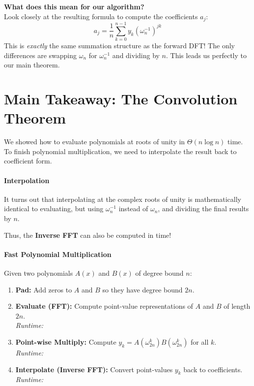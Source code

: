 \documentclass[11  pt]{article}
\begin{document}
\vs{1cm}

\textbf{What does this mean for our algorithm?} \\
Look closely at the resulting formula to compute the coefficients $a_j$:
\begin{equation*}
    a_j = \frac{1}{n} \sum_{k=0}^{n-1} y_k (\omega_n^{-1})^{jk}
\end{equation*}
This is \emph{exactly} the same summation structure as the forward DFT! The only differences are swapping $\omega_n$ for $\omega_n^{-1}$ and dividing by $n$. This leads us perfectly to our main theorem.

\newpage

\section{Main Takeaway: The Convolution Theorem}

We showed how to evaluate polynomials at roots of unity in $\Theta(n \log n)$ time. To finish polynomial multiplication, we need to interpolate the result back to coefficient form.

\paragraph{Interpolation} 
It turns out that interpolating at the complex roots of unity is mathematically identical to evaluating, but using $\omega_n^{-1}$ instead of $\omega_n$, and dividing the final results by $n$. 

Thus, the \textbf{Inverse FFT} can also be computed in  time!

\vs{1.5cm}

\paragraph{Fast Polynomial Multiplication}

Given two polynomials $A(x)$ and $B(x)$ of degree bound $n$:
\begin{enumerate}
    \setlength\itemsep{2em}
    \item \textbf{Pad:} Add zeros to $A$ and $B$ so they have degree bound $2n$.
    \item \textbf{Evaluate (FFT):} Compute point-value representations of $A$ and $B$ of length $2n$. \\ \textit{Runtime: }
    \item \textbf{Point-wise Multiply:} Compute $y_k = A(\omega_{2n}^k) B(\omega_{2n}^k)$ for all $k$. \\ \textit{Runtime: }
    \item \textbf{Interpolate (Inverse FFT):} Convert point-values $y_k$ back to coefficients. \\ \textit{Runtime: }
\end{enumerate}
\end{document}
